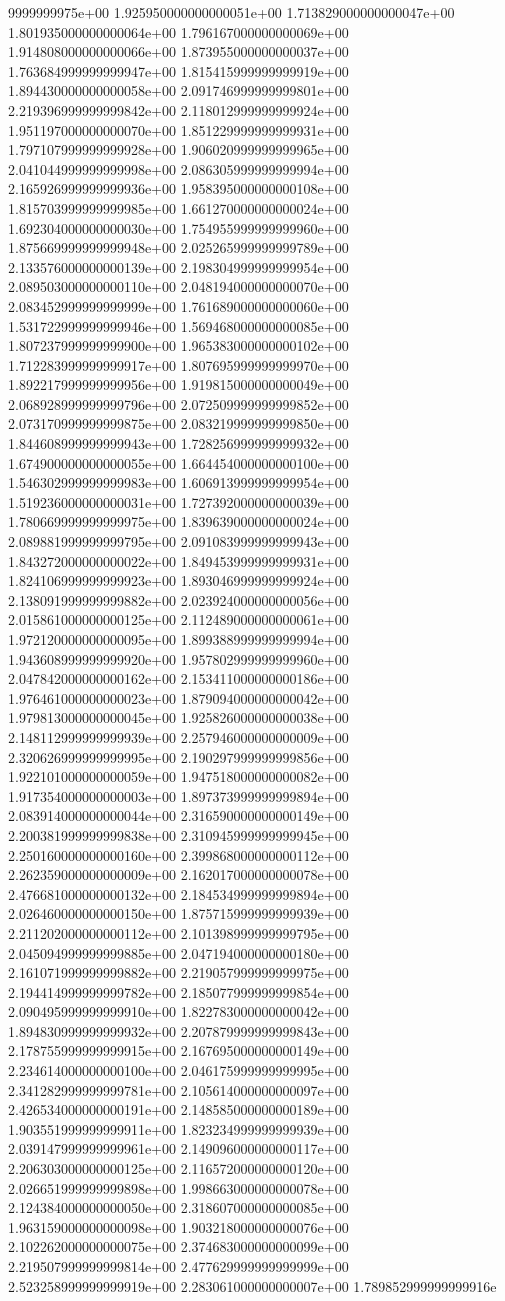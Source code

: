 9999999975e+00	1.925950000000000051e+00	1.713829000000000047e+00	1.801935000000000064e+00	1.796167000000000069e+00	1.914808000000000066e+00	1.873955000000000037e+00	1.763684999999999947e+00	1.815415999999999919e+00	1.894430000000000058e+00	2.091746999999999801e+00	2.219396999999999842e+00	2.118012999999999924e+00	1.951197000000000070e+00	1.851229999999999931e+00	1.797107999999999928e+00	1.906020999999999965e+00	2.041044999999999998e+00	2.086305999999999994e+00	2.165926999999999936e+00	1.958395000000000108e+00	1.815703999999999985e+00	1.661270000000000024e+00	1.692304000000000030e+00	1.754955999999999960e+00	1.875669999999999948e+00	2.025265999999999789e+00	2.133576000000000139e+00	2.198304999999999954e+00	2.089503000000000110e+00	2.048194000000000070e+00	2.083452999999999999e+00	1.761689000000000060e+00	1.531722999999999946e+00	1.569468000000000085e+00	1.807237999999999900e+00	1.965383000000000102e+00	1.712283999999999917e+00	1.807695999999999970e+00	1.892217999999999956e+00	1.919815000000000049e+00	2.068928999999999796e+00	2.072509999999999852e+00	2.073170999999999875e+00	2.083219999999999850e+00	1.844608999999999943e+00	1.728256999999999932e+00	1.674900000000000055e+00	1.664454000000000100e+00	1.546302999999999983e+00	1.606913999999999954e+00	1.519236000000000031e+00	1.727392000000000039e+00	1.780669999999999975e+00	1.839639000000000024e+00	2.089881999999999795e+00	2.091083999999999943e+00	1.843272000000000022e+00	1.849453999999999931e+00	1.824106999999999923e+00	1.893046999999999924e+00	2.138091999999999882e+00	2.023924000000000056e+00	2.015861000000000125e+00	2.112489000000000061e+00	1.972120000000000095e+00	1.899388999999999994e+00	1.943608999999999920e+00	1.957802999999999960e+00	2.047842000000000162e+00	2.153411000000000186e+00	1.976461000000000023e+00	1.879094000000000042e+00	1.979813000000000045e+00	1.925826000000000038e+00	2.148112999999999939e+00	2.257946000000000009e+00	2.320626999999999995e+00	2.190297999999999856e+00	1.922101000000000059e+00	1.947518000000000082e+00	1.917354000000000003e+00	1.897373999999999894e+00	2.083914000000000044e+00	2.316590000000000149e+00	2.200381999999999838e+00	2.310945999999999945e+00	2.250160000000000160e+00	2.399868000000000112e+00	2.262359000000000009e+00	2.162017000000000078e+00	2.476681000000000132e+00	2.184534999999999894e+00	2.026460000000000150e+00	1.875715999999999939e+00	2.211202000000000112e+00	2.101398999999999795e+00	2.045094999999999885e+00	2.047194000000000180e+00	2.161071999999999882e+00	2.219057999999999975e+00	2.194414999999999782e+00	2.185077999999999854e+00	2.090495999999999910e+00	1.822783000000000042e+00	1.894830999999999932e+00	2.207879999999999843e+00	2.178755999999999915e+00	2.167695000000000149e+00	2.234614000000000100e+00	2.046175999999999995e+00	2.341282999999999781e+00	2.105614000000000097e+00	2.426534000000000191e+00	2.148585000000000189e+00	1.903551999999999911e+00	1.823234999999999939e+00	2.039147999999999961e+00	2.149096000000000117e+00	2.206303000000000125e+00	2.116572000000000120e+00	2.026651999999999898e+00	1.998663000000000078e+00	2.124384000000000050e+00	2.318607000000000085e+00	1.963159000000000098e+00	1.903218000000000076e+00	2.102262000000000075e+00	2.374683000000000099e+00	2.219507999999999814e+00	2.477629999999999999e+00	2.523258999999999919e+00	2.283061000000000007e+00	1.789852999999999916e